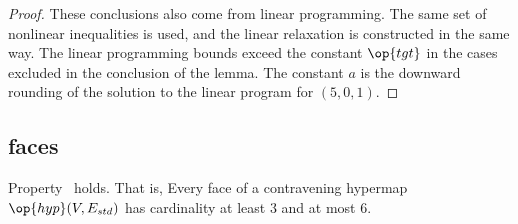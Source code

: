 \begin{proof} These conclusions also come from linear programming.
  The same set of nonlinear inequalities is used, and the linear
  relaxation is constructed in the same way.  The linear programming
  bounds exceed the constant $\op{tgt}$ in the cases excluded in the
  conclusion of the lemma.  The constant $a$ is the downward rounding
  of the solution to the linear program for $(5,0,1)$.
\end{proof}
%

%

\subsection{faces}



\begin{lemma}  \label{lemma:face-size}
  Property~ holds.  That is, Every face of a
  contravening hypermap $\op{hyp}(V,E_{std})$ has cardinality at least
  $3$ and at most $6$.
\end{lemma}

